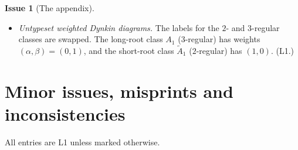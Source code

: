\documentclass[12pt,letterpaper]{article}
\newcommand{\Lv}[1]{\textsf{L#1}}
\theoremstyle{definition}
\newtheorem{issue}{Issue}[section]
\begin{document}
\begin{issue}[The appendix]
\begin{itemize}
\begin{itemize}
justified.
\item The claim ``$7$ $F$-classes'' in the stable subregular class conflicts
with my count. The component group is $A(u)=S_3$ and $H^1(F,G_2)=1$, so the
classes correspond to étale cubic $F$-algebras. There are $8$ of these when
$q\equiv1\pmod 3$ and $6$ when $q\equiv2\pmod 3$ ($p\neq2,3$). Please check
Assem's statement.
\end{itemize}
(\Lv{1} with \Lv{3} inputs.)
\item \emph{Untypeset weighted Dynkin diagrams.} The labels for the $2$- and
$3$-regular classes are swapped. The long-root class $A_1$ ($3$-regular) has
weights $(\alpha,\beta)=(0,1)$, and the short-root class $\tilde A_1$
($2$-regular) has $(1,0)$. (\Lv{1}.)
\end{itemize}
\end{issue}

\section{Minor issues, misprints and inconsistencies}

All entries are \Lv{1} unless marked otherwise.
\end{document}

